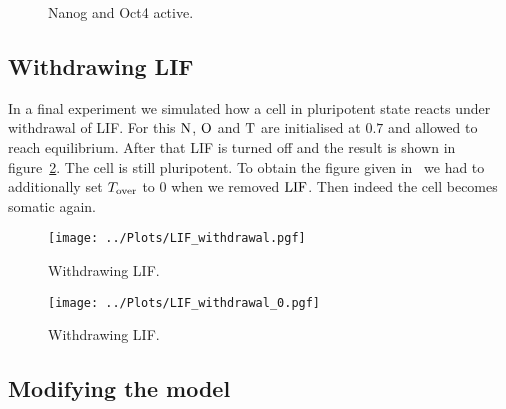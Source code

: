 \begin{figure}
\centering
\begin{minipage}[t]{0.3\textwidth}
\centering
\graphicspath{{../Plots/}}

\end{minipage}
\hfill
\centering
\begin{minipage}[t]{0.3\textwidth}
\centering
\graphicspath{{../Plots/}}

\end{minipage}
\hspace*{0.2cm}
\begin{minipage}[t]{0.3\textwidth}
\centering
\graphicspath{{../Plots/}}

\end{minipage}
\caption{Nanog and Oct4 active.}
\label{pl:NO}
\end{figure}

\subsection{Withdrawing LIF}

In a final experiment we simulated how a cell in pluripotent state reacts under withdrawal of LIF.
For this $\text{N}$, $\text{O}$ and $\text{T}$ are initialised at $0.7$ and allowed to reach equilibrium.
After that LIF is turned off and the result is shown in figure~\ref{pl:LIF_withdrawal}.
The cell is still pluripotent.
To obtain the figure given in~\cite{Olariu2016} we had to additionally set $T_\text{over}$ to $0$
when we removed $\text{LIF}$. Then indeed the cell becomes somatic again.

\begin{figure}
  \centering
  \graphicspath{{../Plots/}}
  \texttt{[image: ../Plots/LIF\_withdrawal.pgf]}
  \caption{Withdrawing LIF.}
  \label{pl:LIF_withdrawal}
\end{figure}

\begin{figure}
  \centering
  \graphicspath{{../Plots/}}
  \texttt{[image: ../Plots/LIF\_withdrawal\_0.pgf]}
  \caption{Withdrawing LIF.}
  \label{pl:LIF_withdrawal_proper}
\end{figure}

\subsection{Modifying the model}

